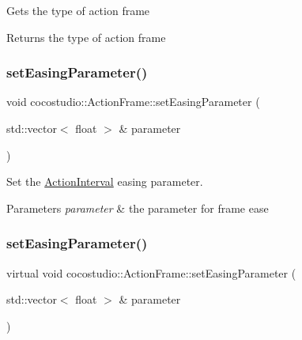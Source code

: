 Gets the type of action frame

\begin{DoxyReturn}{Returns}
the type of action frame 
\end{DoxyReturn}
\mbox{\label{classcocostudio_1_1ActionFrame_afb54df9da9e52bc85488ba6c51b40a28}} 
\subsubsection{\texorpdfstring{set\+Easing\+Parameter()}{setEasingParameter()}\hspace{0.1cm}{\footnotesize\ttfamily [1/2]}}
{\footnotesize\ttfamily void cocostudio\+::\+Action\+Frame\+::set\+Easing\+Parameter (\begin{DoxyParamCaption}\item[{std\+::vector$<$ float $>$ \&}]{parameter }\end{DoxyParamCaption})\hspace{0.3cm}{\ttfamily [virtual]}}

Set the \hyperlink{classActionInterval}{Action\+Interval} easing parameter.


\begin{DoxyParams}{Parameters}
{\em parameter} & the parameter for frame ease \\
\hline
\end{DoxyParams}
\mbox{\label{classcocostudio_1_1ActionFrame_afbb1dbf786653383c15ece664c90fd85}} 
\subsubsection{\texorpdfstring{set\+Easing\+Parameter()}{setEasingParameter()}\hspace{0.1cm}{\footnotesize\ttfamily [2/2]}}
{\footnotesize\ttfamily virtual void cocostudio\+::\+Action\+Frame\+::set\+Easing\+Parameter (\begin{DoxyParamCaption}\item[{std\+::vector$<$ float $>$ \&}]{parameter }\end{DoxyParamCaption})\hspace{0.3cm}{\ttfamily [virtual]}}

